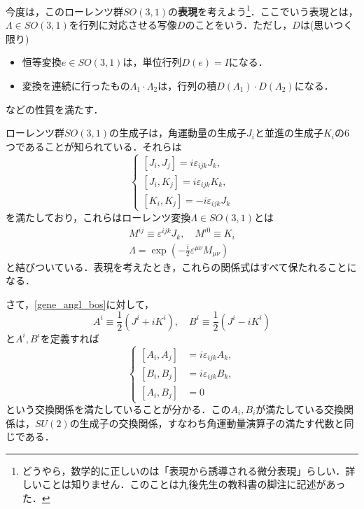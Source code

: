 \documentclass[a4paper,uplatex,dvipdfmx]{jsarticle}
\theoremstyle{definition}
\begin{document}
今度は，このローレンツ群$SO(3,1)$の\textbf{表現}を考えよう\footnote{
  どうやら，数学的に正しいのは「表現から誘導される微分表現」らしい．詳しいことは知りません．このことは九後先生の教科書\cite{九後_ゲー_1989a}の脚注に記述があった．
}．ここでいう表現とは，$\Lambda\in SO(3,1)$を行列に対応させる写像$D$のことをいう．ただし，$D$は(思いつく限り)
\begin{itemize}
  \item 
  恒等変換$e\in SO(3,1)$は，単位行列$D(e)=I$になる．
  \item 
  変換を連続に行ったもの$\Lambda_{1}\cdot\Lambda_{2}$は，行列の積$D(\Lambda_{1})\cdot D(\Lambda_{2})$になる．
\end{itemize}
などの性質を満たす．

ローレンツ群$SO(3,1)$の生成子は，角運動量の生成子$J_{i}$と並進の生成子$K_{i}$の6つであることが知られている．それらは
\begin{equation}
  \left\{
    \begin{alignedat}{1}
      [J_{i},J_{j}]
      =
      i\varepsilon_{ijk}J_{k}
      ,
      \\
      [J_{i},K_{j}]
      =
      i\varepsilon_{ijk}K_{k}
      ,
      \\
      [K_{i},K_{j}]
      =
      -i\varepsilon_{ijk}J_{k}
    \end{alignedat}
  \right.
  \label{gene_angl_bos}
\end{equation}
を満たしており，これらはローレンツ変換$\Lambda\in SO(3,1)$とは
\begin{gather}
  M^{ij}
  \equiv
  \varepsilon^{ijk}J_{k}
  ,\quad
  M^{i0}
  \equiv
  K_{i}
  \\
  \Lambda
  =
  \exp
  \left(  
    -\frac{i}{2}\varepsilon^{\mu\nu}M_{\mu\nu}
  \right)
\end{gather}
と結びついている．表現を考えたとき，これらの関係式はすべて保たれることになる．

さて，\eqref{gene_angl_bos}に対して，
\begin{equation}
  A^{i}
  \equiv
  \frac{1}{2}(J^{i}+iK^{i})
  ,\quad
  B^{i}
  \equiv
  \frac{1}{2}(J^{i}-iK^{i})
\end{equation}
と$A^{i},B^{i}$を定義すれば
\begin{equation}
  \left\{
    \begin{alignedat}{1}
      [A_{i},A_{j}]
      &=
      i\varepsilon_{ijk}A_{k}
      ,
      \\
      [B_{i},B_{j}]
      &=
      i\varepsilon_{ijk}B_{k}
      ,
      \\
      [A_{i},B_{j}]&=0
    \end{alignedat}
  \right.
  \label{gen_AB}
\end{equation}
という交換関係を満たしていることが分かる．この$A_{i},B_{i}$が満たしている交換関係は，$SU(2)$の生成子の交換関係，すなわち角運動量演算子の満たす代数と同じである．
\end{document}
